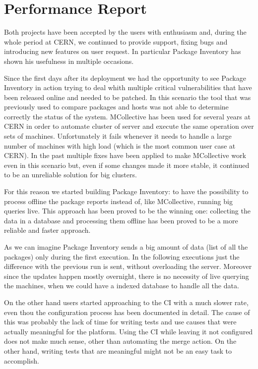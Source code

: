 \section{Performance Report}

Both projects have been accepted by the users with enthusiasm and, during
the whole period at CERN, we continued to provide support, fixing bugs and
introducing new features on user request. In particular Package Inventory
has shown his usefulness in multiple occasions.

Since the first days after its deployment we had the opportunity to see
Package Inventory in action trying to deal whith multiple critical
vulnerabilities that have been released online and needed to be patched.
In this scenario the tool that was previously used to compare packages and
hosts was not able to determine correctly the status of the system.
MCollective has been used for several years at CERN in order to automate
cluster of server and execute the same operation over sets of machines.
Unfortunately it fails whenever it needs to handle a large number of
machines with high load (which is the most common user case at CERN). In
the past multiple fixes have been applied to make MCollective work even in
this scenario but, even if some changes made it more stable, it continued
to be an unreliable solution for big clusters.

For this reason we started building Package Inventory: to have the
possibility to process offline the package reports instead of, like
MCollective, running big queries live. This approach has been proved to be
the winning one: collecting the data in a database and processing them
offline has been proved to be a more reliable and faster approach.

As we can imagine Package Inventory sends a big amount of data (list of
all the packages) only during the first execution. In the following
executions just the difference with the previous run is sent, without
overloading the server. Moreover since the updates happen mostly
overnight, there is no necessity of live querying the machines, when we
could have a indexed database to handle all the data.

On the other hand users started approaching to the CI with a much slower
rate, even thou the configuration process has been documented in detail.
The cause of this was probably the lack of time for writing tests and use
causes that were actually meaningful for the platform. Using the CI while
leaving it not configured does not make much sense, other than automating
the merge action. On the other hand, writing tests that are meaningful
might not be an easy task to accomplish. 
